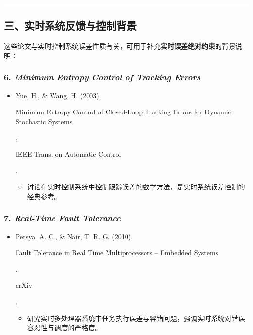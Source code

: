 \documentclass[
]{article}
\begin{document}
\begin{center}\rule{0.5\linewidth}{0.5pt}\end{center}

\subsection{三、实时系统反馈与控制背景}\label{ux4e09ux5b9eux65f6ux7cfbux7edfux53cdux9988ux4e0eux63a7ux5236ux80ccux666f}

这些论文与实时控制系统误差性质有关，可用于补充\textbf{实时误差绝对约束}的背景说明：

\subsubsection{\texorpdfstring{6. \emph{Minimum Entropy Control of
Tracking
Errors}}{6. Minimum Entropy Control of Tracking Errors}}\label{6-minimum-entropy-control-of-tracking-errors}

\begin{itemize}
\item
  Yue, H., \& Wang, H. (2003).

  Minimum Entropy Control of Closed‑Loop Tracking Errors for Dynamic
  Stochastic Systems

  ,

  IEEE Trans. on Automatic Control

  .

  \begin{itemize}
  \item
    讨论在实时控制系统中控制跟踪误差的数学方法，是实时系统误差控制的经典参考。
  \end{itemize}
\end{itemize}

\subsubsection{\texorpdfstring{7. \emph{Real-Time Fault
Tolerance}}{7. Real-Time Fault Tolerance}}\label{7-real-time-fault-tolerance}

\begin{itemize}
\item
  Persya, A. C., \& Nair, T. R. G. (2010).

  Fault Tolerance in Real Time Multiprocessors -- Embedded Systems

  .

  arXiv

  .

  \begin{itemize}
  \item
    研究实时多处理器系统中任务执行误差与容错问题，强调实时系统对错误容忍性与调度的严格度。
  \end{itemize}
\end{itemize}
\end{document}
